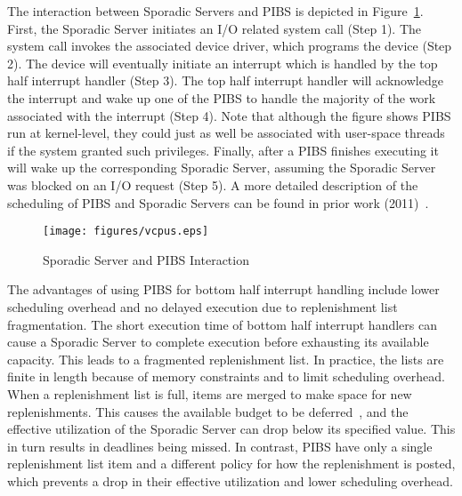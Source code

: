The interaction between Sporadic Servers and PIBS is depicted in
Figure~\ref{fig:vcpus}.  First, the Sporadic Server initiates an I/O related
system call (Step 1).  The system call invokes the associated device driver,
which programs the device (Step 2).  The device will eventually initiate an
interrupt which is handled by the top half interrupt handler (Step 3).  The
top half interrupt handler will acknowledge the interrupt and wake up one of
the PIBS to handle the majority of the work associated with the interrupt
(Step 4).  Note that although the figure shows PIBS run at kernel-level, they
could just as well be associated with user-space threads if the system granted
such privileges.  Finally, after a PIBS finishes executing it will wake up the
corresponding Sporadic Server, assuming the Sporadic Server was blocked on an
I/O request (Step 5).  A more detailed description of the scheduling of PIBS
and Sporadic Servers can be found in prior work (2011)~\cite{DanishLiWe11}.

\begin{figure}[h]
  \vspace{0.1in}
  \centering
  \texttt{[image: figures/vcpus.eps]}
  \vspace{0.1in}
  \caption{Sporadic Server and PIBS Interaction}
  \label{fig:vcpus}
  \vspace{-0.3in}
\end{figure}

The advantages of using PIBS for bottom half interrupt handling include lower
scheduling overhead and no delayed execution due to replenishment list
fragmentation.  The short execution time of bottom half interrupt handlers can
cause a Sporadic Server to complete execution before exhausting its available
capacity. This leads to a fragmented replenishment list. In practice, the lists
are finite in length because of memory constraints and to limit scheduling
overhead. When a replenishment list is full, items are merged to make space for
new replenishments. This causes the available budget to be
deferred~\cite{StanovichBaWa10}, and the effective utilization of the Sporadic
Server can drop below its specified value. This in turn results in deadlines
being missed.  In contrast, PIBS have only a single replenishment list item and
a different policy for how the replenishment is posted, which prevents a drop in
their effective utilization and lower scheduling overhead.


